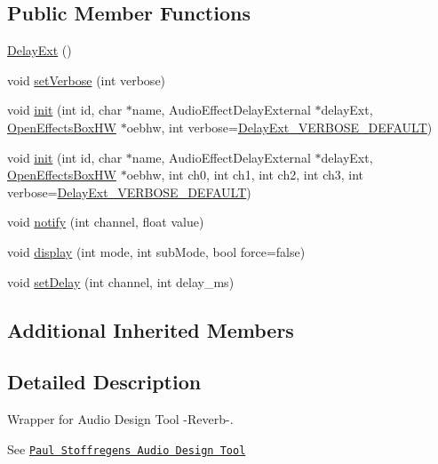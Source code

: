 \subsection*{Public Member Functions}
\begin{DoxyCompactItemize}
\item 
\mbox{\hyperlink{class_delay_ext_ad0b56c7a3db3c36dc02ac08ff59ca809}{Delay\+Ext}} ()
\item 
void \mbox{\hyperlink{class_delay_ext_aced3df43297e5f6092fc2a652ab712d2}{set\+Verbose}} (int verbose)
\item 
void \mbox{\hyperlink{class_delay_ext_ac1e47f4764e44f0a623687c7a2a95e6f}{init}} (int id, char $\ast$name, Audio\+Effect\+Delay\+External $\ast$delay\+Ext, \mbox{\hyperlink{class_open_effects_box_h_w}{Open\+Effects\+Box\+HW}} $\ast$oebhw, int verbose=\mbox{\hyperlink{_delay_ext_8h_a1c2b9cd031a3baecf2c7d96325dcb9b1}{Delay\+Ext\+\_\+\+V\+E\+R\+B\+O\+S\+E\+\_\+\+D\+E\+F\+A\+U\+LT}})
\item 
void \mbox{\hyperlink{class_delay_ext_aa7e84d74c1080b5473a7401a5042b305}{init}} (int id, char $\ast$name, Audio\+Effect\+Delay\+External $\ast$delay\+Ext, \mbox{\hyperlink{class_open_effects_box_h_w}{Open\+Effects\+Box\+HW}} $\ast$oebhw, int ch0, int ch1, int ch2, int ch3, int verbose=\mbox{\hyperlink{_delay_ext_8h_a1c2b9cd031a3baecf2c7d96325dcb9b1}{Delay\+Ext\+\_\+\+V\+E\+R\+B\+O\+S\+E\+\_\+\+D\+E\+F\+A\+U\+LT}})
\item 
void \mbox{\hyperlink{class_delay_ext_a76001b2a3aad7ce1a2e1220ab7387be4}{notify}} (int channel, float value)
\item 
void \mbox{\hyperlink{class_delay_ext_a53d22982c98ab7cc1206744304ecd5a9}{display}} (int mode, int sub\+Mode, bool force=false)
\item 
void \mbox{\hyperlink{class_delay_ext_a8b6e5eca2cdca8ea83a71cf57bec96dc}{set\+Delay}} (int channel, int delay\+\_\+ms)
\end{DoxyCompactItemize}
\subsection*{Additional Inherited Members}


\subsection{Detailed Description}
Wrapper for Audio Design Tool -\/\+Reverb-\/. 

See \href{https://www.pjrc.com/teensy/gui/}{\tt Paul Stoffregen\textquotesingle{}s Audio Design Tool}

